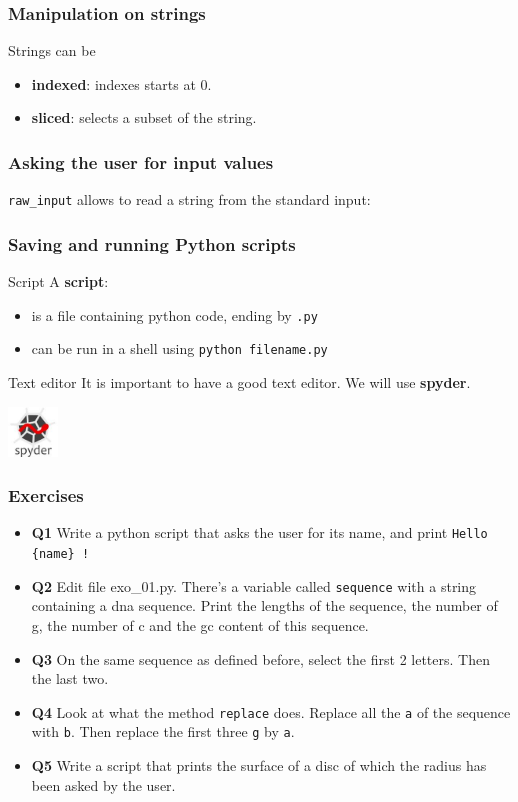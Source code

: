 \documentclass[xcolor=dvipsnames]{beamer}
\begin{document}
\begin{frame}
\frametitle{Manipulation on strings}
Strings can be
\begin{itemize}
\item \textbf{indexed}: indexes starts at 0.

\item \textbf{sliced}: selects a subset of the string.

\end{itemize}
\end{frame}

\begin{frame}
\frametitle{Asking the user for input values}
\texttt{raw\_input} allows to read a string from the standard input:

\end{frame}

\begin{frame}
\frametitle{Saving and running Python scripts}
\begin{block}{Script}
A \textbf{script}:
\begin{itemize}
\item is a file containing python code, ending by \texttt{.py}
\item can be run in a shell using \texttt{python filename.py}
\end{itemize}
\end{block}

\begin{alertblock}{Text editor}
It is important to have a good text editor. We will use \textbf{spyder}.
\begin{center}
\includegraphics[width=50px]{images/spyder.jpg}
\end{center}
\end{alertblock}
\end{frame}

\begin{frame}
\frametitle{Exercises}
\begin{itemize}
\item \textbf{Q1} Write a python script that asks the user for its name, and
print \texttt{Hello \{name\} !}
\item \textbf{Q2} Edit file exo\_01.py. There's a variable called \texttt{sequence} with a
string containing a dna sequence. Print the lengths of the sequence, the
number of g, the number of c and the gc content of this sequence.
\item \textbf{Q3} On the same sequence as defined before, select the first 2
letters. Then the last two.
\item \textbf{Q4} Look at what the method \texttt{replace} does. Replace all
the \texttt{a} of the sequence with \texttt{b}. Then replace the first three
\texttt{g} by \texttt{a}.
\item \textbf{Q5} Write a script that prints the surface of a disc of which
the radius has been asked by the user.
\end{itemize}
\end{frame}
\end{document}
